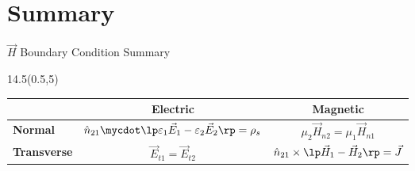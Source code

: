 \section{Summary}
\begin{frame}{$\vec{H}$ Boundary Condition Summary}
\begin{textblock}{14.5}(0.5,5)
\begin{center}
\renewcommand{\arraystretch}{1.5}
\begin{tabular}{| l | c | c | }
\hline

	& \textbf{Electric} 	
	& \textbf{Magnetic} \\\hline\hline
\textbf{Normal}		
	& $\hat{n}_{21} \mycdot \lp \varepsilon_1 \vec{E}_1 - \varepsilon_2 \vec{E}_2 \rp = \rho_s$
	& $\mu_2 \vec{H}_{n2}  = \mu_1  \vec{H}_{n1}$ \\ \hline
\textbf{Transverse}	
	& $\vec{E}_{t1} = \vec{E}_{t2}$ 
	&$ \hat{n}_{21} \times \lp \vec{H}_1 - \vec{H}_2 \rp = \vec{J} $\\ \hline					
\end{tabular}
\end{center}
\end{textblock}
\end{frame}

